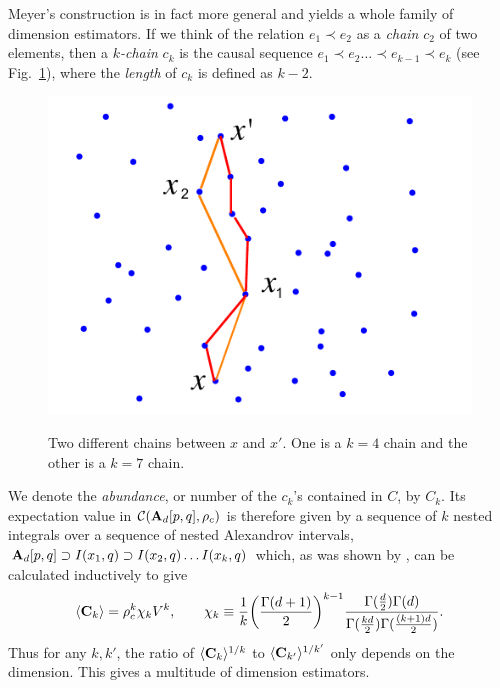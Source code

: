 Meyer's construction is in fact
more general and yields a whole family of dimension estimators.  If we think of the relation  $e_1\prec e_2$ as a \emph{chain} $c_2$ of two elements, then a \emph{$k$-chain} $c_k$ is the causal sequence $e_1 \prec e_2 \ldots \prec e_{k-1} \prec
e_k$ (see Fig.~\ref{chain.fig}), where the \emph{length} of $c_k$ is defined as $k-2$.
\begin{figure}[ht]
\centering \resizebox{3in}{!}  {\includegraphics[width=\textwidth]{chains}}
\caption{Two different chains between $x$ and $x'$. One is a $k=4$ chain and the other is a $k=7$ chain.}
\label{chain.fig}
\end{figure}
We denote the \emph{abundance}, or number  of the $c_k$'s contained  in $C$, by $C_k$. Its expectation value in
$\mathcal C(\mathbf A_d[p,q],\rho_c)$ is therefore  given by a sequence of $k$ nested integrals over a sequence of nested Alexandrov
intervals,  $\mathbf A_d[p,q] \supset  I(x_1,q) \supset I(x_2,q) \ldots I(x_k, q) $ which, as was shown by \cite{meyer},  can be
calculated inductively to give 
\begin{equation} \label{eq:ckflat}  
\langle {\mathbf C_k} \rangle =\rho_c^k\chi_k V^k, \qquad 
\chi_k\equiv \frac{1}{k} \biggl(\frac{\Gamma(d+1)}{2}\biggr)^{k-1}
\frac{\Gamma(\frac{d}{2})\Gamma(d)}{\Gamma(\frac{kd}{2})\Gamma(\frac{(k+1)d}{2})}.
\end{equation} 
Thus for any $k,k'$, the ratio of $\langle {\mathbf C_k} \rangle^{1/k}$ to ${\langle {\mathbf C_{k'}} \rangle^{1/k'}}$ only depends on the dimension. This
gives a multitude of dimension estimators. 


